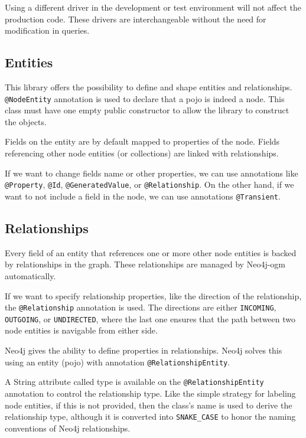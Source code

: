 Using a different driver in the development or test environment will not affect the production code. These drivers are interchangeable without the need for modification in queries.

\subsection {Entities}

This library offers the possibility to define and shape entities and relationships. \texttt{@NodeEntity} annotation is used to declare that a \acrfull{pojo}
is indeed a node. This class must have one empty public constructor to allow the library to construct the objects.

Fields on the entity are by default mapped to properties of the node. Fields referencing other node entities (or collections) are linked with relationships.

If we want to change fields name or other properties, we can use annotations like \texttt{@Property}, \texttt{@Id}, \texttt{@GeneratedValue}, or \texttt{@Relationship}. On the other hand,
if we want to not include a field in the node, we can use annotations \texttt{@Transient}.

\subsection {Relationships}

Every field of an entity that references one or more other node entities is backed by relationships in the graph. These relationships are managed by Neo4j-\acrshort{ogm} automatically.

If we want to specify relationship properties, like the direction of the relationship, the \texttt{@Relationship} annotation is used. The directions are either \texttt{INCOMING},
\texttt{OUTGOING}, or \texttt{UNDIRECTED}, where the last one ensures that the path between two node entities is navigable from either side.

Neo4j gives the ability to define properties in relationships. Neo4j solves this using an entity (\acrshort{pojo}) with annotation \texttt{@RelationshipEntity}.

A String attribute called type is available on the \texttt{@RelationshipEntity} annotation to control the relationship type. Like the simple strategy for labeling node entities,
if this is not provided, then the class's name is used to derive the relationship type, although it is converted into \texttt{SNAKE\_CASE} to honor
the naming conventions of Neo4j relationships. \cite{noauthor_reference_nodate}

